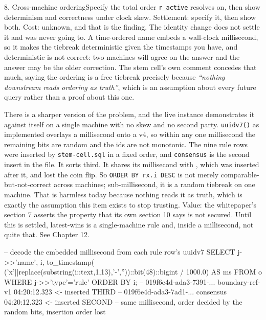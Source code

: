 \begin{Open}{8. Cross-machine ordering}{Specify the total order \texttt{r\_active} resolves on, then show determinism and correctness under clock skew.}
Settlement: specify it, then show both. Cost: unknown, and that is the finding. The identity change does not settle it and was never going to. A time-ordered name embeds a wall-clock millisecond, so it makes the tiebreak deterministic given the timestamps you have, and deterministic is not correct: two machines will agree on the answer and the answer may be the older correction. The stem cell's own comment concedes that much, saying the ordering is a free tiebreak precisely because \textit{``nothing downstream reads ordering as truth''}, which is an assumption about every future query rather than a proof about this one.

There is a sharper version of the problem, and the live instance demonstrates it against itself on a single machine with no skew and no second party. \texttt{uuidv7()} as implemented overlays a millisecond onto a v4, so within any one millisecond the remaining bits are random and the ids are not monotonic. The nine rule rows were inserted by \texttt{stem-cell.sql} in a fixed order, and \texttt{consensus} is the second insert in the file. It sorts third. It shares its millisecond with , which was inserted after it, and lost the coin flip. So \texttt{ORDER BY rx.i DESC} is not merely comparable-but-not-correct across machines; sub-millisecond, it is a random tiebreak on one machine. That is harmless today because nothing reads it as truth, which is exactly the assumption this item exists to stop trusting. Value: the whitepaper's section 7 asserts the property that its own section 10 says is not secured. Until this is settled, latest-wins is a single-machine rule and, inside a millisecond, not quite that. See Chapter 12.
\begin{Check}
-- decode the embedded millisecond from each rule row's uuidv7
SELECT j->>'name', i, to_timestamp(
  ('x'||replace(substring(i::text,1,13),'-',''))::bit(48)::bigint / 1000.0) AS ms
FROM o WHERE j->>'type'='rule' ORDER BY i;
-- 019f6e4d-ada3-7391-...  boundary-ref-v1   04:20:12.323   <- inserted THIRD
-- 019f6e4d-ada3-7ad1-...  consensus         04:20:12.323   <- inserted SECOND
-- same millisecond, order decided by the random bits, insertion order lost
\end{Check}
\end{Open}

